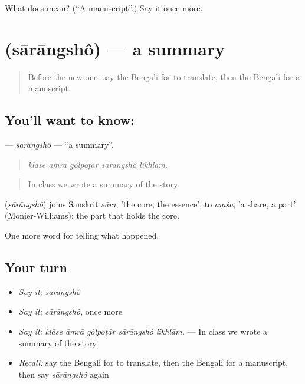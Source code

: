 \begin{tcolorbox}[breakable,colback=teal!4,colframe=teal!35!black,title={Before you move on}]
What does  mean? (\textquotedblleft{}A manuscript\textquotedblright{}.) Say it once more.
\end{tcolorbox}
\section[\texorpdfstring{\bn{সারাংশ} (sārāngshô)}{সারাংশ (sārāngshô)}]{ (sārāngshô) — a summary}

\label{lesson:BN-C328-sarangsho}



\begin{quote}
Before the new one: say the Bengali for to translate, then the Bengali for a manuscript.
\end{quote}

\subsection*{You'll want to know: }
\textbf{} — \emph{sārāngshô} — \textquotedblleft{}a summary\textquotedblright{}.

\begin{quote}
    
\end{quote}

\begin{quote}
\emph{klāse āmrā gôlpoṭār sārāngshô likhlām.}
\end{quote}

\begin{quote}
In class we wrote a summary of the story.
\end{quote}

\begin{cousinweb}
\textbf{} (\emph{sārāngshô}) joins Sanskrit \emph{sāra}, 'the core, the essence', to \emph{aṃśa}, 'a share, a part' (Monier-Williams): the part that holds the core.
\end{cousinweb}

\begin{grammarlens}[title={What you've built}]
One more word for telling what happened.
\end{grammarlens}

\subsection*{Your turn}
\begin{itemize}
\raggedright
  \item \emph{Say it:} \emph{sārāngshô}
  \item \emph{Say it:} \emph{sārāngshô}, once more
  \item \emph{Say it:} \emph{klāse āmrā gôlpoṭār sārāngshô likhlām.} — In class we wrote a summary of the story.
  \item \emph{Recall:} say the Bengali for to translate, then the Bengali for a manuscript, then say \emph{sārāngshô} again
\end{itemize}

